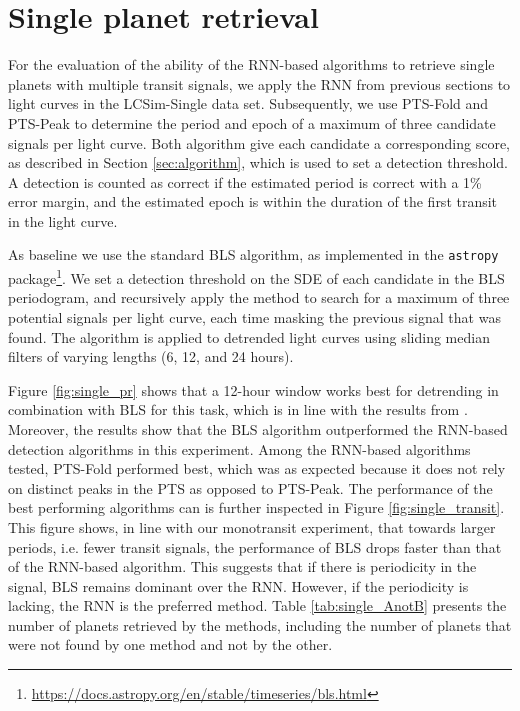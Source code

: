 
\section{Single planet retrieval}
\label{sec:singles}

For the evaluation of the ability of the RNN-based algorithms to retrieve single planets with multiple transit signals, we apply the RNN from previous sections to light curves in the LCSim-Single data set. Subsequently, we use PTS-Fold and PTS-Peak to determine the period and epoch of a maximum of three candidate signals per light curve. Both algorithm give each candidate a corresponding score, as described in Section \ref{sec:algorithm}, which is used to set a detection threshold. A detection is counted as correct if the estimated period is correct with a 1\% error margin, and the estimated epoch is within the duration of the first transit in the light curve.

As baseline we use the standard BLS algorithm, as implemented in the \texttt{astropy} package\footnote{\url{https://docs.astropy.org/en/stable/timeseries/bls.html}}. We set a detection threshold on the SDE of each candidate in the BLS periodogram, and recursively apply the method to search for a maximum of three potential signals per light curve, each time masking the previous signal that was found. The algorithm is applied to detrended light curves using sliding median filters of varying lengths (6, 12, and 24 hours).

Figure \ref{fig:single_pr} shows that a 12-hour window works best for detrending in combination with BLS for this task, which is in line with the results from \cite{hippke2019wotan}. Moreover, the results show that the BLS algorithm outperformed the RNN-based detection algorithms in this experiment. Among the RNN-based algorithms tested, PTS-Fold performed best, which was as expected because it does not rely on distinct peaks in the PTS as opposed to PTS-Peak. The performance of the best performing algorithms can is further inspected in Figure \ref{fig:single_transit}. This figure shows, in line with our monotransit experiment, that towards larger periods, i.e. fewer transit signals, the performance of BLS drops faster than that of the RNN-based algorithm. This suggests that if there is periodicity in the signal, BLS remains dominant over the RNN. However, if the periodicity is lacking, the RNN is the preferred method. Table \ref{tab:single_AnotB} presents the number of planets retrieved by the methods, including the number of planets that were not found by one method and not by the other.

